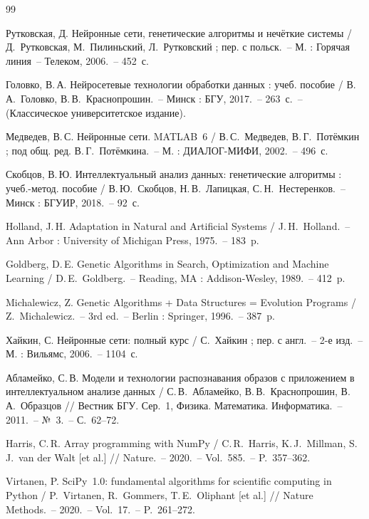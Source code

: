 \begin{thebibliography}{99}

Рутковская, Д. Нейронные сети, генетические алгоритмы и нечёткие системы / Д.~Рутковская,
М.~Пилиньский, Л.~Рутковский ; пер. с польск.~-- М. : Горячая линия~-- Телеком, 2006.~-- 452~с.

Головко, В.\,А. Нейросетевые технологии обработки данных : учеб. пособие / В.\,А.~Головко,
В.\,В.~Краснопрошин.~-- Минск : БГУ, 2017.~-- 263~с.~-- (Классическое университетское издание).

Медведев, В.\,С. Нейронные сети. MATLAB~6 / В.\,С.~Медведев, В.\,Г.~Потёмкин ; под общ. ред.
В.\,Г.~Потёмкина.~-- М. : ДИАЛОГ-МИФИ, 2002.~-- 496~с.

Скобцов, В.\,Ю. Интеллектуальный анализ данных: генетические алгоритмы : учеб.-метод. пособие /
В.\,Ю.~Скобцов, Н.\,В.~Лапицкая, С.\,Н.~Нестеренков.~-- Минск : БГУИР, 2018.~-- 92~с.

Holland, J.\,H. Adaptation in Natural and Artificial Systems / J.\,H.~Holland.~-- Ann Arbor :
University of Michigan Press, 1975.~-- 183~p.

Goldberg, D.\,E. Genetic Algorithms in Search, Optimization and Machine Learning /
D.\,E.~Goldberg.~-- Reading, MA : Addison-Wesley, 1989.~-- 412~p.

Michalewicz, Z. Genetic Algorithms + Data Structures = Evolution Programs / Z.~Michalewicz.~-- 3rd
ed.~-- Berlin : Springer, 1996.~-- 387~p.

Хайкин, С. Нейронные сети: полный курс / С.~Хайкин ; пер. с англ.~-- 2-е изд.~-- М. : Вильямс,
2006.~-- 1104~с.

Абламейко, С.\,В. Модели и технологии распознавания образов с приложением в интеллектуальном анализе
данных / С.\,В.~Абламейко, В.\,В.~Краснопрошин, В.\,А.~Образцов // Вестник БГУ. Сер.~1, Физика.
Математика. Информатика.~-- 2011.~-- №~3.~-- С.~62--72.

Harris, C.\,R. Array programming with NumPy / C.\,R.~Harris, K.\,J.~Millman, S.\,J.~van der Walt [et al.]
// Nature.~-- 2020.~-- Vol.~585.~-- P.~357--362.

Virtanen, P. SciPy~1.0: fundamental algorithms for scientific computing in Python / P.~Virtanen,
R.~Gommers, T.\,E.~Oliphant [et al.] // Nature Methods.~-- 2020.~-- Vol.~17.~-- P.~261--272.


\end{thebibliography}
